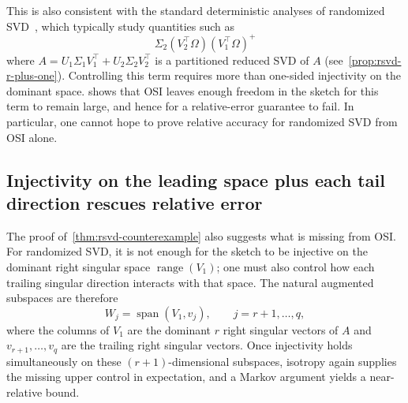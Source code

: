 \documentclass[onefignum,onetabnum]{siamart251216}
\newcommand{\range}{\operatorname{range}}
\begin{document}
This is also consistent with the standard deterministic analyses of randomized SVD~\cite{HalkoMartinssonTropp2011,MartinssonTropp2020}, which typically study quantities such as
\[
\Sigma_2(V_2^\top\Omega)(V_1^\top\Omega)^+
\]
where $A = U_1\Sigma_1V_1^\top + U_2\Sigma_2V_2^\top$ is a partitioned reduced SVD of $A$ (see~\cref{prop:rsvd-r-plus-one}).  Controlling this term requires more than one-sided injectivity on the dominant space.   shows that OSI leaves enough freedom in the sketch for this term to remain large, and hence for a relative-error guarantee to fail. In particular,  one cannot hope to prove relative accuracy for randomized SVD from OSI alone.

\subsection{Injectivity on the leading space plus each tail direction rescues relative error}\label{sec:positiveForrSVD}

The proof of~\cref{thm:rsvd-counterexample} also suggests what is missing from OSI.  For randomized SVD, it is not enough for the sketch to be injective on the dominant right singular space $\range(V_1)$; one must also control how each trailing singular direction interacts with that space.  The natural augmented subspaces are therefore
\[
W_j = \operatorname{span}(V_1,v_j),
\qquad j=r+1,\dots,q,
\]
where the columns of $V_1$ are the dominant $r$ right singular vectors of $A$ and $v_{r+1},\dots,v_q$ are the trailing right singular vectors.  Once injectivity holds simultaneously on these $(r+1)$-dimensional subspaces, isotropy again supplies the missing upper control in expectation, and a Markov argument yields a near-relative bound.
\end{document}
